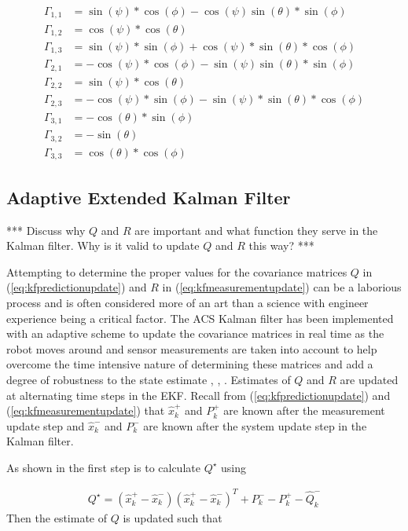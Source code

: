 \begin{align*}
\Gamma_{1,1} &= \sin(\psi)*\cos(\phi)-\cos(\psi)\sin(\theta)*\sin(\phi) \\
\Gamma_{1,2} &= \cos(\psi)*\cos(\theta) \\
\Gamma_{1,3} &= \sin(\psi)*\sin(\phi)+\cos(\psi)*\sin(\theta)*\cos(\phi) \\
\Gamma_{2,1} &= -\cos(\psi)*\cos(\phi)-\sin(\psi)\sin(\theta)*\sin(\phi) \\
\Gamma_{2,2} &= \sin(\psi)*\cos(\theta) \\
\Gamma_{2,3} &= -\cos(\psi)*\sin(\phi)-\sin(\psi)*\sin(\theta)*\cos(\phi) \\
\Gamma_{3,1} &= -\cos(\theta)*\sin(\phi) \\
\Gamma_{3,2} &= -\sin(\theta) \\
\Gamma_{3,3} &= \cos(\theta)*\cos(\phi)
\end{align*}

\subsection{Adaptive Extended Kalman Filter}
\label{sec:adaptiveekf}
*** Discuss why $Q$ and $R$ are important and what function they serve in the Kalman filter. Why is it valid to update $Q$ and $R$ this way? ***

Attempting to determine the proper values for the covariance matrices $Q$ in (\ref{eq:kfpredictionupdate}) and $R$ in (\ref{eq:kfmeasurementupdate}) can be a laborious process and is often considered more of an art than a science with engineer experience being a critical factor. The ACS Kalman filter has been implemented with an adaptive scheme to update the covariance matrices in real time as the robot moves around and sensor measurements are taken into account to help overcome the time intensive nature of determining these matrices and add a degree of robustness to the state estimate \cite{Sights06}, \cite{Mehra72}, \cite{Busse03adaptiveEKF}. Estimates of $Q$ and $R$ are updated at alternating time steps in the EKF. Recall from (\ref{eq:kfpredictionupdate}) and (\ref{eq:kfmeasurementupdate}) that $\hat{x}_k^+$ and $P_k^+$ are known after the measurement update step and $\hat{x}_k^-$ and $P_k^-$ are known after the system update step in the Kalman filter.

As shown in \cite{Busse03adaptiveEKF} the first step is to calculate $Q^\star$ using

\begin{align*}
Q^\star = \left(\hat{x}_k^+-\hat{x}_k^-\right)\left(\hat{x}_k^+-\hat{x}_k^-\right)^T + P_k^- - P_k^+ - \hat{Q}_k^-
\end{align*}
Then the estimate of $Q$ is updated such that

